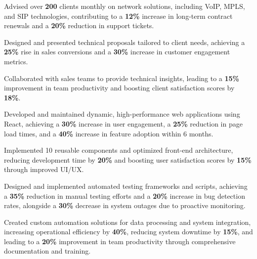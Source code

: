 \documentclass[]{farhan-resume-openfont}
\begin{document}
\begin{minipage}[t]{0.70\textwidth}
        \begin{tightemize}
            \item Advised over \textbf{200} clients monthly on network solutions, including VoIP,
            MPLS, and SIP technologies, contributing to a \textbf{12\%} increase in
            long-term contract renewals and a \textbf{20\%} reduction in support tickets.
            \item Designed and presented technical proposals tailored to client needs, achieving
            a \textbf{25\%} rise in sales conversions and a \textbf{30\%} increase in
            customer engagement metrics.
            \item Collaborated with sales teams to provide technical insights, leading to a \textbf{15\%}
            improvement in team productivity and boosting client satisfaction scores by
            \textbf{18\%}.
    \end{tightemize}
    \sectionsep

    \begin{tightemize}
        \item Developed and maintained dynamic, high-performance web applications using
        React, achieving a \textbf{30\%} increase in user engagement, a \textbf{25\%}
        reduction in page load times, and a \textbf{40\%} increase in feature adoption
        within 6 months.
        \item Implemented 10 reusable components and optimized front-end architecture,
        reducing development time by \textbf{20\%} and boosting user satisfaction
        scores by \textbf{15\%} through improved UI/UX.
    \end{tightemize}
    \sectionsep

    \begin{tightemize}
        \item Designed and implemented automated testing frameworks and scripts, achieving a
        \textbf{35\%} reduction in manual testing efforts and a \textbf{20\%} increase
        in bug detection rates, alongside a \textbf{30\%} decrease in system outages
        due to proactive monitoring.
        \item Created custom automation solutions for data processing and system integration,
        increasing operational efficiency by \textbf{40\%}, reducing system downtime by
        \textbf{15\%}, and leading to a \textbf{20\%} improvement in team productivity
        through comprehensive documentation and training.
    \end{tightemize}

\end{minipage}
\end{document}
